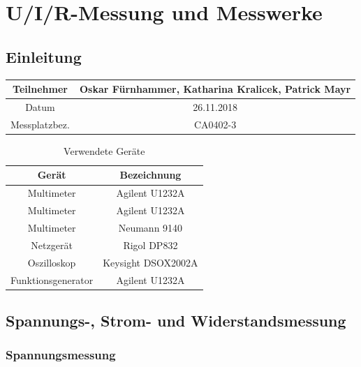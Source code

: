 \chapter{U/I/R-Messung und Messwerke}
\section{Einleitung}

\begin{table}[h]
	\centering
	\begin{tabular}{|c|c|}
		\hline 
		Teilnehmer 		& Oskar Fürnhammer, Katharina Kralicek, Patrick Mayr \\
		\hline 
		Datum 		& 26.11.2018 \\ 
		\hline 
		Messplatzbez. 	& CA0402-3 \\
		\hline
	\end{tabular} 
\end{table}

\begin{table}[h]
	\centering
	\begin{tabular}{ c | c }

Gerät				& Bezeichnung		\\
\hline

Multimeter			& Agilent U1232A 		\\
Multimeter			& Agilent U1232A 		\\
Multimeter			& Neumann 9140	 	\\
Netzgerät			& Rigol DP832 		\\
Oszilloskop			& Keysight DSOX2002A 	\\
Funktionsgenerator		& Agilent U1232A 		\\

	\end{tabular}

	\caption{Verwendete Geräte}

\end{table}

\newpage

\section{Spannungs-, Strom- und Widerstandsmessung}

\subsection{Spannungsmessung}
